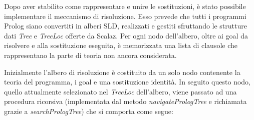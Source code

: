 Dopo aver stabilito come rappresentare e unire le sostituzioni, è stato possibile implementare il meccanismo di risoluzione. Esso prevede che tutti i programmi Prolog siano convertiti in alberi SLD, realizzati e gestiti sfruttando le strutture dati \textit{Tree} e \textit{TreeLoc} offerte da Scalaz. Per ogni nodo dell'albero, oltre ai goal da risolvere e alla sostituzione eseguita, è memorizzata una lista di clausole che rappresentano la parte di teoria non ancora considerata.

Inizialmente l'albero di risoluzione è costituito da un solo nodo contenente la teoria del programma, i goal e una sostituzione identità. In seguito questo nodo, quello attualmente selezionato nel \textit{TreeLoc} dell'albero, viene passato ad una procedura ricorsiva (implementata dal metodo \textit{navigatePrologTree} e richiamata grazie a \textit{searchPrologTree}) che si comporta come segue:

